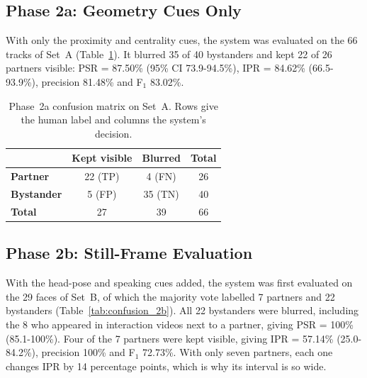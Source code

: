 \subsection{Phase 2a: Geometry Cues Only}
\label{sec:res_2a}

With only the proximity and centrality cues, the system was evaluated on the 66 tracks of
Set~A (Table~\ref{tab:confusion_2a}). It blurred 35 of 40 bystanders and kept 22 of 26
partners visible: PSR = 87.50\% (95\% CI 73.9-94.5\%), IPR = 84.62\% (66.5-93.9\%),
precision 81.48\% and F$_1$ 83.02\%.

\begin{table}[htbp]
\begin{singlespace}
\centering
\caption{Phase~2a confusion matrix on Set~A. Rows give the human label and columns the
system's decision.}
\label{tab:confusion_2a}
\renewcommand{\arraystretch}{1.3}
\begin{tabular}{@{}lccc@{}}
\toprule
 & \textbf{Kept visible} & \textbf{Blurred} & \textbf{Total} \\
\midrule
\textbf{Partner}   & 22 (TP) & 4 (FN)  & 26 \\
\textbf{Bystander} & 5 (FP)  & 35 (TN) & 40 \\
\textbf{Total}     & 27      & 39      & 66 \\
\bottomrule
\end{tabular}
\end{singlespace}
\end{table}

\subsection{Phase 2b: Still-Frame Evaluation}
\label{sec:res_2b}

With the head-pose and speaking cues added, the system was first evaluated on the 29 faces
of Set~B, of which the majority vote labelled 7 partners and 22 bystanders
(Table~\ref{tab:confusion_2b}). All 22 bystanders were blurred, including the 8 who
appeared in interaction videos next to a partner, giving PSR = 100\% (85.1-100\%). Four of
the 7 partners were kept visible, giving IPR = 57.14\% (25.0-84.2\%), precision 100\% and
F$_1$ 72.73\%. With only seven partners, each one changes IPR by 14 percentage points,
which is why its interval is so wide.

